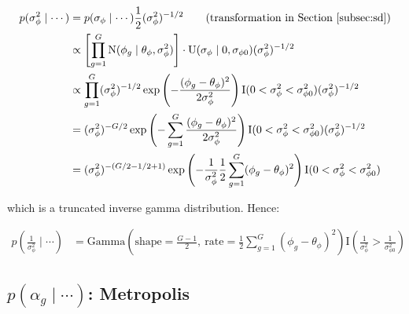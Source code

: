 \documentclass{article}\usepackage{graphicx, color}
\begin{document}
\begin{flushleft}
\begin{align*}
p(\sigma_\phi^2 \mid \cdots ) &= p(\sigma_\phi \mid \cdots) \frac{1}{2} (\sigma_\phi^2)^{-1/2} \qquad \text{(transformation in Section \ref{subsec:sd})} \\
&\propto \left [ \prod_{g = 1}^G \text{N}( \phi_g \mid \theta_\phi, \sigma_\phi^2) \right ] \cdot \text{U}(\sigma_\phi \mid 0, \sigma_{\phi 0})  (\sigma_\phi^2)^{-1/2}  \\ 
&\propto  \prod_{g = 1}^G (\sigma_\phi^2)^{-1/2} \exp \left ( - \frac{(\phi_g - \theta_\phi)^2}{2 \sigma_\phi^2} \right ) \text{I}(0 < \sigma_\phi^2 < \sigma_{\phi 0}^2) (\sigma_\phi^2)^{-1/2} \\
&=  (\sigma_\phi^2)^{-G/2} \exp \left ( - \sum_{g = 1}^G \frac{(\phi_g - \theta_\phi)^2}{2 \sigma_\phi^2} \right ) \text{I}(0 < \sigma_\phi^2 < \sigma_{\phi 0}^2) (\sigma_\phi^2)^{-1/2} \\
&=  (\sigma_\phi^2)^{-(G/2 - 1/2 +1) } \exp \left ( - \frac{1}{\sigma_\phi^2} \frac{1}{2} \sum_{g = 1}^G (\phi_g - \theta_\phi)^2 \right ) \text{I}(0 < \sigma_\phi^2 < \sigma_{\phi 0}^2) \\
\end{align*}

which is a truncated inverse gamma distribution. Hence:

\begin{align*}
p \left ( \frac{1}{\sigma_\phi^2} \mid \cdots \right ) &= \text{Gamma} \left ( \text{shape} = \frac{G - 1}{2}, \ \text{rate} =  \frac{1}{2} \sum_{g = 1}^G (\phi_g - \theta_\phi)^2  \right )   \text{I} \left (\frac{1}{\sigma_\phi^2} >\frac{1}{ \sigma_{\phi 0}^2} \right )
\end{align*}


























\subsection{$p (\alpha_g \mid \cdots) $: Metropolis}




\end{flushleft}
\end{document}
